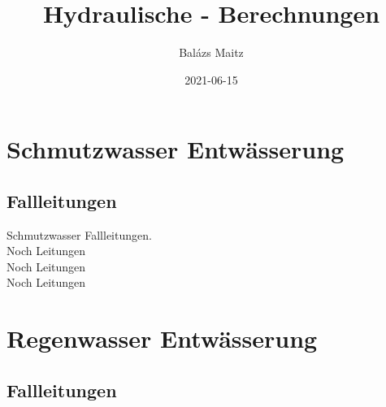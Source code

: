 \documentclass[12pt]{report}
\author{Balázs Maitz} %
\title{Hydraulische - Berechnungen} %
\date{2021-06-15} %
\begin{document}
\maketitle
\tableofcontents


\pagebreak


\section*{Schmutzwasser Entwässerung}
\subsection*{Fallleitungen}

Schmutzwasser Fallleitungen.\\
Noch Leitungen\\
Noch Leitungen\\
Noch Leitungen\\

\pagebreak



\section*{Regenwasser Entwässerung}
\subsection*{Fallleitungen}
\end{document}
